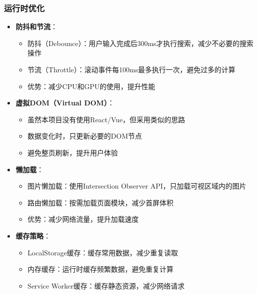 \documentclass[12pt,a4paper]{article}
\begin{document}
\subsubsection{运行时优化}
\begin{itemize}
    \item \textbf{防抖和节流}：
        \begin{itemize}
            \item 防抖（Debounce）：用户输入完成后300ms才执行搜索，减少不必要的搜索操作
            \item 节流（Throttle）：滚动事件每100ms最多执行一次，避免过多的计算
            \item 优势：减少CPU和GPU的使用，提升性能
        \end{itemize}
    \item \textbf{虚拟DOM（Virtual DOM）}：
        \begin{itemize}
            \item 虽然本项目没有使用React/Vue，但采用类似的思路
            \item 数据变化时，只更新必要的DOM节点
            \item 避免整页刷新，提升用户体验
        \end{itemize}
    \item \textbf{懒加载}：
        \begin{itemize}
            \item 图片懒加载：使用Intersection Observer API，只加载可视区域内的图片
            \item 路由懒加载：按需加载页面模块，减少首屏体积
            \item 优势：减少网络流量，提升加载速度
        \end{itemize}
    \item \textbf{缓存策略}：
        \begin{itemize}
            \item LocalStorage缓存：缓存常用数据，减少重复读取
            \item 内存缓存：运行时缓存频繁数据，避免重复计算
            \item Service Worker缓存：缓存静态资源，减少网络请求
        \end{itemize}
\end{itemize}
\end{document}
